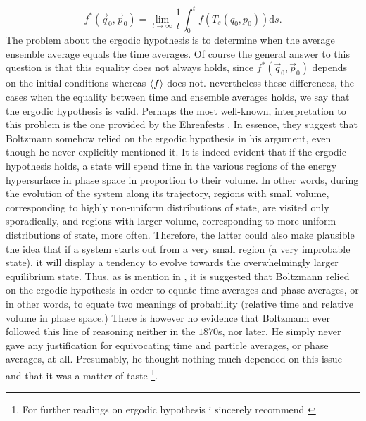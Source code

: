 \begin{equation}
f^{*}\left(\vec{q}_{0},\vec{p}_{0}\right)=\lim _{t \rightarrow \infty} \frac{1}{t} \int_{0}^{t} f\left(T_{s}\left(q_{0}, p_{0}\right)\right) \mathrm{d} s.
\label{CH1:Ergodicity_1}
\end{equation}
The problem about the ergodic hypothesis is to determine when the average ensemble average equals the time averages. Of course the general answer to this question is that this equality does not always holds, since $f^{*}(\vec{q}_{0},\vec{p}_{0})$ depends on the initial conditions whereas $\mathinner{\langle{f}\rangle}$ does not. nevertheless these differences, the cases when the equality between time and ensemble averages holds, we say that the ergodic hypothesis is valid.
\newline
Perhaps the most well-known, interpretation to this problem is the one provided by the Ehrenfests \cite{ehrenfest_conceptual_1959}. In essence, they suggest that Boltzmann somehow relied on the ergodic hypothesis in his argument, even though he never explicitly mentioned it.
\newline
It is indeed evident that if the ergodic hypothesis holds, a state will spend time in the various regions of the energy hypersurface in phase space in proportion to their volume. In other words, during the evolution of the system along its trajectory, regions with small volume, corresponding to highly non-uniform distributions of state, are visited only sporadically, and regions with larger volume, corresponding to more uniform distributions of state, more often.
\newline
Therefore, the latter could also make plausible  the idea that if a system starts out from a very small region (a very improbable state), it will display a tendency to evolve towards the overwhelmingly larger equilibrium state.
\newline
Thus, as is mention in \cite{ehrenfest_conceptual_1959}, it is  suggested that Boltzmann relied on the ergodic hypothesis in order to equate time averages and phase averages, or in other words, to equate two meanings of probability (relative time and relative volume in phase space.) There is however no evidence that Boltzmann ever followed this line of reasoning neither in the $1870$s, nor later. He simply never gave any justification for equivocating time and particle averages, or phase averages, at all. Presumably, he thought nothing much depended on this issue and that it was a matter of taste \footnote{For further readings on ergodic hypothesis i sincerely recommend \cite{oliveira_ergodic_2007, engelhardt_simple_2015, gallavotti_statistical_1999,goldstein_boltzmanns_2001,uffink_handbook_2007}}.


